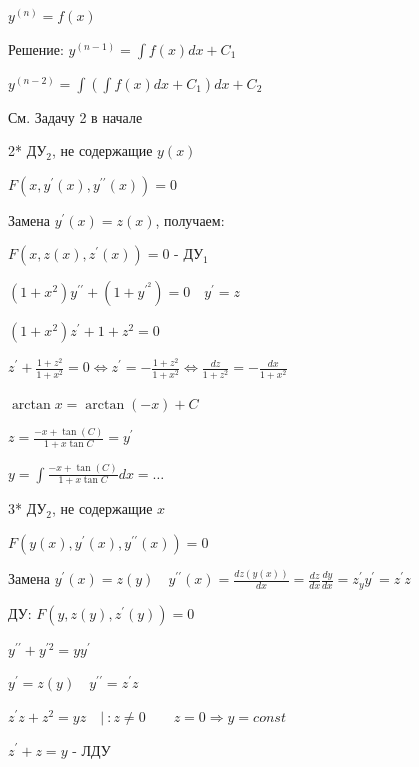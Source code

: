 \documentclass[12pt]{article}
\begin{document}
    $\displaystyle y^{(n)} = f(x)$

    Решение: $\displaystyle y^{(n - 1)} = \int f(x) dx + C_1$

    $\displaystyle y^{(n - 2)} = \int (\int f(x) dx + C_1) dx + C_2$

    \Ex См. Задачу 2 в начале

    2* ДУ$\displaystyle _2$, не содержащие $y(x)$

    $\displaystyle F(x, y^\prime(x), y^{\prime\prime}(x)) = 0$

    Замена $\displaystyle y^\prime(x) = z(x)$, получаем:

    $\displaystyle F(x, z(x), z^\prime(x)) = 0$ - ДУ$\displaystyle _1$

    \Ex $\displaystyle (1 + x^2)y^{\prime\prime} + (1 + y^\prime^2) = 0 \quad y^\prime = z$

    $\displaystyle (1 + x^2)z^\prime + 1 + z^2 = 0$

    $\displaystyle z^\prime + \frac{1 + z^2}{1 + x^2} = 0 \Longleftrightarrow z^\prime = -\frac{1 + z^2}{1 + x^2} \Longleftrightarrow \frac{dz}{1 + z^2} = -\frac{dx}{1 + x^2}$

    $\arctan x = \arctan(-x) + C$

    $\displaystyle z = \frac{-x + \tan(C)}{1 + x \tan C} = y^\prime$

    $\displaystyle y = \int \frac{-x + \tan(C)}{1 + x \tan C} dx = \dots $

    3* ДУ$\displaystyle _2$, не содержащие $x$

    $\displaystyle F(y(x), y^\prime(x), y^{\prime\prime}(x)) = 0$

    Замена $\displaystyle y^\prime(x) = z(y) \quad y^{\prime\prime}(x) = \frac{dz(y(x))}{dx} = \frac{dz}{dx} \frac{dy}{dx} = z^\prime_y y^\prime = z^\prime z$

    ДУ: $\displaystyle F(y, z(y), z^\prime(y)) = 0$

    \Ex $\displaystyle y^{\prime\prime} + y^{\prime 2} = yy^\prime$

    $\displaystyle y^\prime = z(y) \quad y^{\prime\prime} = z^\prime z$

    $\displaystyle z^\prime z + z^2 = yz \quad | \ : z \neq 0 \quad\quad z = 0 \Longrightarrow y = const$

    $\displaystyle z^\prime + z = y$ - ЛДУ
\end{document}
